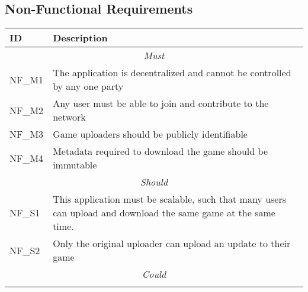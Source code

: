 \subsection{Non-Functional Requirements}

\begin{longtable}{ p{} p{} }
  \toprule
  \textbf{ID} & \textbf{Description}
  \\\midrule\midrule
  \multicolumn{2}{c}{\cellcolor{red!70}\textit{Must}}\\\midrule
  NF\_M1 & The application is decentralized and cannot be controlled by any one party\\
  NF\_M2 & Any user must be able to join and contribute to the network\\
  NF\_M3 & Game uploaders should be publicly identifiable\\
  NF\_M4 & Metadata required to download the game should be immutable\\
  \midrule\multicolumn{2}{c}{\cellcolor{orange!70}\textit{Should}}\\\midrule
  NF\_S1 & This application must be scalable, such that many users can upload and download the same game at the same time.\\
  NF\_S2 & Only the original uploader can upload an update to their game\\
  \midrule\multicolumn{2}{c}{\cellcolor{green}\textit{Could}}\\\midrule
  \\
  \midrule
  \bottomrule
\end{longtable}